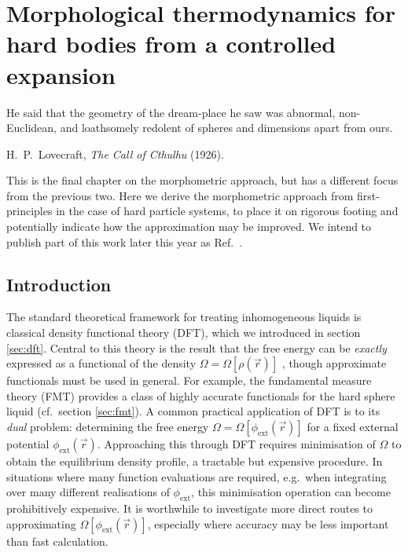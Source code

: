\documentclass[11pt,twoside]{report}
\begin{document}
\chapter{Morphological thermodynamics for hard bodies from a controlled expansion}
\epigraph{He said that the geometry of the dream-place he saw was abnormal, non-Euclidean, and loathsomely redolent of spheres and dimensions apart from ours.}{H.\ P.\ Lovecraft, \emph{The Call of Cthulhu} (1926).}
\label{chapter:resummation}

This is the final chapter on the morphometric approach, but has a different focus from the previous two.
Here we derive the morphometric approach from first-principles in the case of hard particle systems, to place it on rigorous footing and potentially indicate how the approximation may be improved.
We intend to publish part of this work later this year as Ref.\ \cite{RobinsonResummation2019}.

\section{Introduction}

The standard theoretical framework for treating inhomogeneous liquids is classical density functional theory (DFT), which we introduced in section \ref{sec:dft}.
Central to this theory is the result that the free energy can be \emph{exactly} expressed as a functional of the density $\Omega = \Omega[\rho(\vec{r})]$ \cite{EvansAP1979}, though approximate functionals must be used in general.
For example, the fundamental measure theory (FMT) \cite{RosenfeldPRL1989} provides a class of highly accurate functionals for the hard sphere liquid (cf.\ section \ref{sec:fmt}).
A common practical application of DFT is to its \emph{dual} problem: determining the free energy $\Omega = \Omega[\phi_\mathrm{ext}(\vec{r})]$ for a fixed external potential $\phi_\mathrm{ext}(\vec{r})$.
Approaching this through DFT requires minimisation of $\Omega$ to obtain the equilibrium density profile, a tractable but expensive procedure.
In situations where many function evaluations are required, e.g.\ when integrating over many different realisations of $\phi_\mathrm{ext}$, this minimisation operation can become prohibitively expensive.
It is worthwhile to investigate more direct routes to approximating $\Omega[\phi_\mathrm{ext}(\vec{r})]$, especially where accuracy may be less important than fast calculation.
\end{document}
